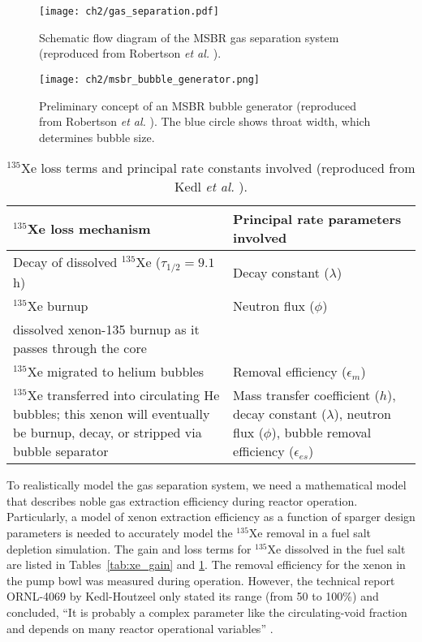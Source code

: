 \begin{figure}[htp!] %
	\centering
	\texttt{[image: ch2/gas\_separation.pdf]}
	\caption{Schematic flow diagram of the \gls{MSBR} gas separation system 
		(reproduced from Robertson \emph{et al.} 
		\cite{robertson_conceptual_1971}).}
	\label{fig:gas_removal_system}
\end{figure}
\begin{figure}[htp!] %
	\centering
	\texttt{[image: ch2/msbr\_bubble\_generator.png]}
	\caption{Preliminary concept of an \gls{MSBR} bubble generator (reproduced 
	from Robertson \emph{et al.} \cite{robertson_conceptual_1971}). 
	The blue circle shows throat width, which determines bubble size.}
	\vspace{-0.25in}
	\label{fig:bubble_separator}
\end{figure}
\begin{table}[t]
	\caption{$^{135}$Xe loss terms and principal rate constants involved
		(reproduced from Kedl \emph{et al.} \cite{kedl_development_1967}).}
	\centering
	\begin{tabularx}{\textwidth}{b b}
		\hline \textbf{$^{135}$Xe loss mechanism}      & \textbf{Principal 
			rate parameters involved}  	\\[5pt]
		\hline Decay of dissolved $^{135}$Xe ($\tau_{1/2}=9.1$ h)  & Decay 
		constant	($\lambda$)		\\[5pt]
		\hline $^{135}$Xe burnup              &  Neutron flux 
		($\phi$)		 					\\[5pt]
		dissolved xenon-135 burnup as it passes through the core  
		& 			            \\		
		\hline $^{135}$Xe migrated to 
		helium bubbles & Removal efficiency 
		($\epsilon_m$)		\\[5pt]
		\hline $^{135}$Xe transferred into circulating He bubbles; this xenon 
		will eventually be burnup, decay, or stripped via bubble separator & 
		Mass transfer coefficient ($h$), decay constant ($\lambda$), 
		neutron flux ($\phi$), bubble removal efficiency 
		($\epsilon_{es}$)		\\[5pt]
		\hline 
	\end{tabularx}
	\label{tab:xe_loss}
\end{table}

To realistically model the gas separation system, we need a mathematical model 
that describes noble gas extraction efficiency during reactor operation. 
Particularly, a model of xenon extraction efficiency as a function of sparger 
design parameters is needed to accurately model the $^{135}$Xe removal in a 
fuel salt depletion simulation. The gain and loss terms for $^{135}$Xe 
dissolved in the fuel salt are listed in Tables~\ref{tab:xe_gain} and 
\ref{tab:xe_loss}. The removal efficiency for the xenon in the pump bowl was 
measured during  operation. However, the technical report 
ORNL-4069 by Kedl-Houtzeel only stated its range (from 50 to 100\%) and 
concluded, ``It is probably a complex parameter like the circulating-void 
fraction and depends on many reactor operational variables'' 
\cite{kedl_development_1967}. %

